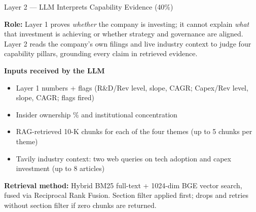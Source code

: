 \documentclass[aspectratio=169]{beamer}
\begin{document}
\begin{frame}{Layer 2 --- LLM Interprets Capability Evidence (40\%)}

\textbf{Role:} Layer 1 proves \emph{whether} the company is investing; it cannot
explain \emph{what} that investment is achieving or whether strategy and
governance are aligned. Layer 2 reads the company's own filings and live
industry context to judge four capability pillars, grounding every claim in
retrieved evidence.

\vspace{0.4cm}
\textbf{Inputs received by the LLM}
\begin{itemize}
  \item Layer 1 numbers + flags (R\&D/Rev level, slope, CAGR; Capex/Rev level, slope, CAGR; flags fired)
  \item Insider ownership \% and institutional concentration
  \item RAG-retrieved 10-K chunks for each of the four themes (up to 5 chunks per theme)
  \item Tavily industry context: two web queries on tech adoption and capex investment (up to 8 articles)
\end{itemize}

\vspace{0.3cm}
\textbf{Retrieval method:} Hybrid BM25 full-text + 1024-dim BGE vector search,
fused via Reciprocal Rank Fusion. Section filter applied first; drops and retries
without section filter if zero chunks are returned.

\end{frame}
\end{document}
